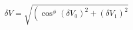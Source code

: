 \begin{equation}
\label{eq:delta_V_Malus}
\delta V = \sqrt{ \left(\cos^{\phi}(\delta V_0)^2 + (\delta V_1)^2}
\end{equation}